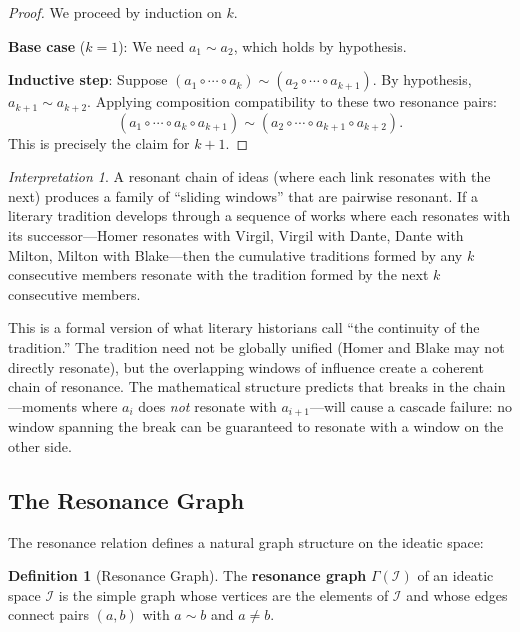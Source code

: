 \documentclass[11pt,openany]{book}
\theoremstyle{definition}
\newtheorem{definition}[axiom]{Definition}
\theoremstyle{plain}
\theoremstyle{remark}
\newtheorem{interpretation}[axiom]{Interpretation}
\newcommand{\IS}{\mathcal{I}}               %
\newcommand{\compose}{\circ}                 %
\newcommand{\res}{\sim}                      %
\begin{document}
\begin{proof}
We proceed by induction on $k$.

\textbf{Base case} ($k = 1$): We need $a_1 \res a_2$, which holds by hypothesis.

\textbf{Inductive step}: Suppose $(a_1 \compose \cdots \compose a_k) \res (a_2 \compose \cdots \compose a_{k+1})$. By hypothesis, $a_{k+1} \res a_{k+2}$. Applying composition compatibility to these two resonance pairs:
\[
(a_1 \compose \cdots \compose a_k \compose a_{k+1}) \res (a_2 \compose \cdots \compose a_{k+1} \compose a_{k+2}).
\]
This is precisely the claim for $k+1$.
\end{proof}

\begin{interpretation}
A resonant chain of ideas (where each link resonates with the next) produces a family of ``sliding windows'' that are pairwise resonant. If a literary tradition develops through a sequence of works where each resonates with its successor---Homer resonates with Virgil, Virgil with Dante, Dante with Milton, Milton with Blake---then the cumulative traditions formed by any $k$ consecutive members resonate with the tradition formed by the next $k$ consecutive members.

This is a formal version of what literary historians call ``the continuity of the tradition.'' The tradition need not be globally unified (Homer and Blake may not directly resonate), but the overlapping windows of influence create a coherent chain of resonance. The mathematical structure predicts that breaks in the chain---moments where $a_i$ does \emph{not} resonate with $a_{i+1}$---will cause a cascade failure: no window spanning the break can be guaranteed to resonate with a window on the other side.
\end{interpretation}

\subsection{The Resonance Graph}

The resonance relation defines a natural graph structure on the ideatic space:

\begin{definition}[Resonance Graph]
The \textbf{resonance graph} $\Gamma(\IS)$ of an ideatic space $\IS$ is the simple graph whose vertices are the elements of $\IS$ and whose edges connect pairs $(a, b)$ with $a \res b$ and $a \neq b$.
\end{definition}
\end{document}
